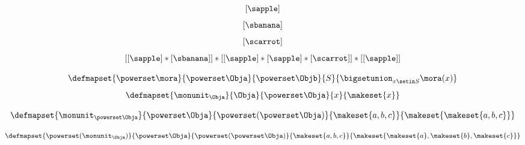 {\begin{forslides}
\begin{equation}
            \label{eq:fruit-sum-16}
            [ \sapple ]
        \end{equation}
        \begin{equation}
            \label{eq:fruit-sum-17}
            [ \sbanana ]
        \end{equation}
        \begin{equation}
            \label{eq:fruit-sum-18}
            [ \scarrot ]
        \end{equation}
        \begin{equation}
            \label{eq:fruit-sum-20}
            [ [ \sapple ]   * [ \sbanana] ] *  [[ \sapple ]   *  [ \sapple ] *  [\scarrot ] ]   *  [[ \sapple ] ]
        \end{equation}

        \begin{equation}
            \label{eq:monad-power-functor}
            \defmapset{
                \powerset \mora
            }{
                \powerset \Obja
            }{
                \powerset \Objb
            }{
                S
            }{
                \bigsetunion_{x\setin S} \mora(x)
            }
        \end{equation}
        \begin{equation}
            \label{eq:monad-power-monunit}
            \defmapset{
                \monunit_\Obja
            }{
                \Obja
            }{
                \powerset\Obja
            }{
                x
            }{
                \makeset{ x }
            }
        \end{equation}

        \begin{equation}
            \label{eq:monad-power-monunit-power}
            \defmapset{
                \monunit_{\powerset \Obja}
            }{
                \powerset \Obja
            }{
                \powerset (\powerset\Obja)
            }{
                \makeset{a, b, c}
            }{
                \makeset{ \makeset{a, b, c } }
            }
        \end{equation}

        \begin{equation}
            \label{eq:monad-power-power-monunit}
            \defmapset{
                \powerset(\monunit_\Obja)
            }{
                \powerset \Obja
            }{
                \powerset (\powerset\Obja)
            }{
                \makeset{a, b, c}
            }{
                \makeset{ \makeset{a}, \makeset{ b}, \makeset{c} }
            }
        \end{equation}


\end{forslides}}
